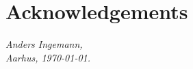 \documentclass[thesis.tex]{subfiles}
\begin{document}
\chapter*{Acknowledgements}
\label{chap:ack}

\todo{\dots}

\vspace{2ex}
\begin{flushright}
  \emph{Anders Ingemann,}\\
  \emph{Aarhus, \today.}
\end{flushright}
\end{document}
